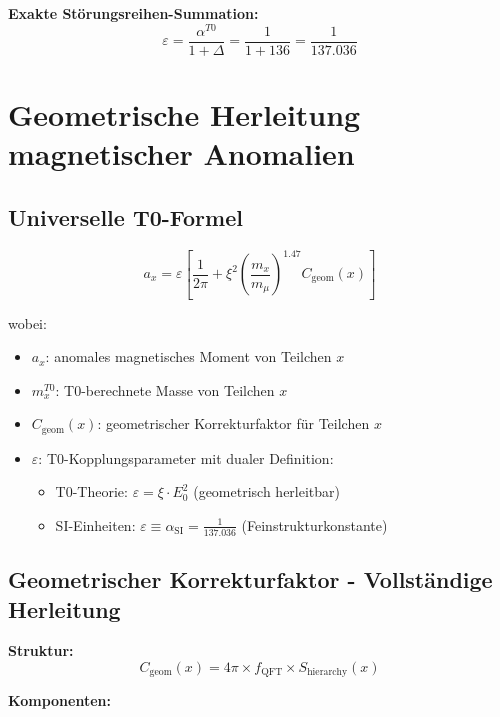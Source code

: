 \documentclass[12pt,a4paper]{article}
\numberwithin{equation}{section}
\newcommand{\xipar}{\xi}
\newcommand{\epsilonT}{\varepsilon}
\newcommand{\alphaSI}{\alpha_{\text{SI}}}
\newcommand{\alphaT}{\alpha^{T0}}
\newcommand{\Cgeom}{C_{\text{geom}}}
\newcommand{\fQFT}{f_{\text{QFT}}}
\newcommand{\Eo}{E_0}
\begin{document}
	\textbf{Exakte Störungsreihen-Summation:}
	\begin{equation}
		\epsilonT = \frac{\alphaT}{1+\Delta} = \frac{1}{1+136} = \frac{1}{137.036}
		\label{eq:epsilon_renormalized}
	\end{equation}
	
	\section{Geometrische Herleitung magnetischer Anomalien}
	
	\subsection{Universelle T0-Formel}
	
	\begin{equation}
		a_x = \epsilonT \left[ \frac{1}{2\pi} + \xipar^2 \left(\frac{m_x}{m_\mu}\right)^{1.47} \Cgeom(x) \right]
		\label{eq:universal_formula}
	\end{equation}
	
	wobei:
	\begin{itemize}
		\item $a_x$: anomales magnetisches Moment von Teilchen $x$
		\item $m_x^{T0}$: T0-berechnete Masse von Teilchen $x$
		\item $\Cgeom(x)$: geometrischer Korrekturfaktor für Teilchen $x$
		\item $\epsilonT$: T0-Kopplungsparameter mit dualer Definition:
		\begin{itemize}
			\item T0-Theorie: $\epsilonT = \xipar \cdot \Eo^2$ (geometrisch herleitbar)
			\item SI-Einheiten: $\epsilonT \equiv \alphaSI = \frac{1}{137.036}$ (Feinstrukturkonstante)
		\end{itemize}
	\end{itemize}
	
	\subsection{Geometrischer Korrekturfaktor - Vollständige Herleitung}
	
	\textbf{Struktur:}
	\begin{equation}
		\Cgeom(x) = 4\pi \times \fQFT \times S_{\text{hierarchy}}(x)
		\label{eq:cgeom_structure}
	\end{equation}
	
	\textbf{Komponenten:}
	
\end{document}
